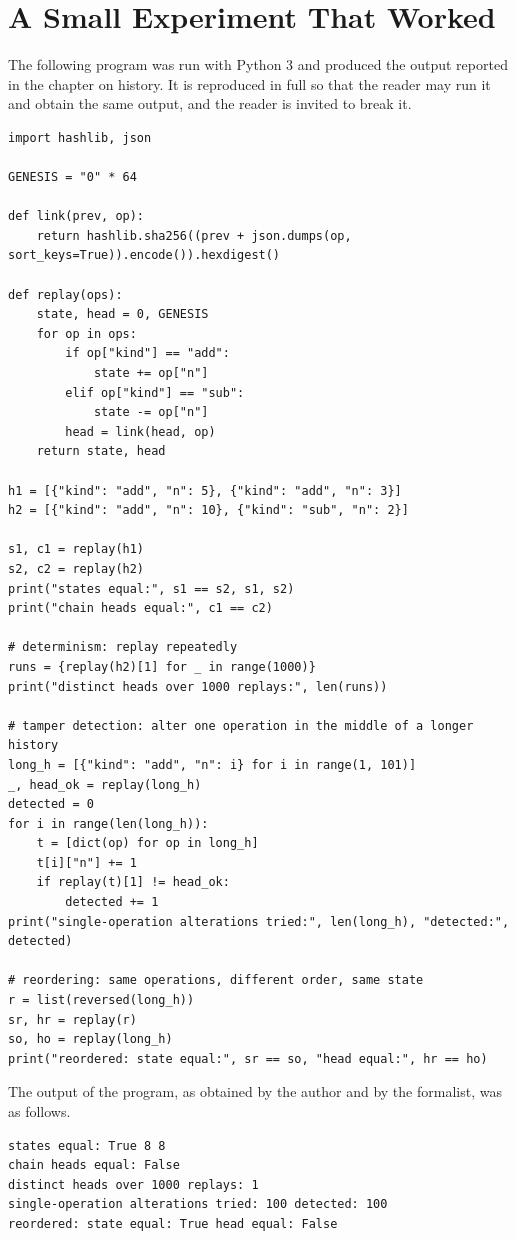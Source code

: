 \documentclass[11pt,openany,twoside]{book}
\theoremstyle{plain}
\theoremstyle{definition}
\theoremstyle{remark}
\begin{document}
\chapter{A Small Experiment That Worked}

The following program was run with Python 3 and produced the output reported in the chapter on history. It is reproduced in full so that the reader may run it and obtain the same output, and the reader is invited to break it.

\begin{verbatim}
import hashlib, json

GENESIS = "0" * 64

def link(prev, op):
    return hashlib.sha256((prev + json.dumps(op, sort_keys=True)).encode()).hexdigest()

def replay(ops):
    state, head = 0, GENESIS
    for op in ops:
        if op["kind"] == "add":
            state += op["n"]
        elif op["kind"] == "sub":
            state -= op["n"]
        head = link(head, op)
    return state, head

h1 = [{"kind": "add", "n": 5}, {"kind": "add", "n": 3}]
h2 = [{"kind": "add", "n": 10}, {"kind": "sub", "n": 2}]

s1, c1 = replay(h1)
s2, c2 = replay(h2)
print("states equal:", s1 == s2, s1, s2)
print("chain heads equal:", c1 == c2)

# determinism: replay repeatedly
runs = {replay(h2)[1] for _ in range(1000)}
print("distinct heads over 1000 replays:", len(runs))

# tamper detection: alter one operation in the middle of a longer history
long_h = [{"kind": "add", "n": i} for i in range(1, 101)]
_, head_ok = replay(long_h)
detected = 0
for i in range(len(long_h)):
    t = [dict(op) for op in long_h]
    t[i]["n"] += 1
    if replay(t)[1] != head_ok:
        detected += 1
print("single-operation alterations tried:", len(long_h), "detected:", detected)

# reordering: same operations, different order, same state
r = list(reversed(long_h))
sr, hr = replay(r)
so, ho = replay(long_h)
print("reordered: state equal:", sr == so, "head equal:", hr == ho)
\end{verbatim}

The output of the program, as obtained by the author and by the formalist, was as follows.

\begin{verbatim}
states equal: True 8 8
chain heads equal: False
distinct heads over 1000 replays: 1
single-operation alterations tried: 100 detected: 100
reordered: state equal: True head equal: False
\end{verbatim}
\end{document}
